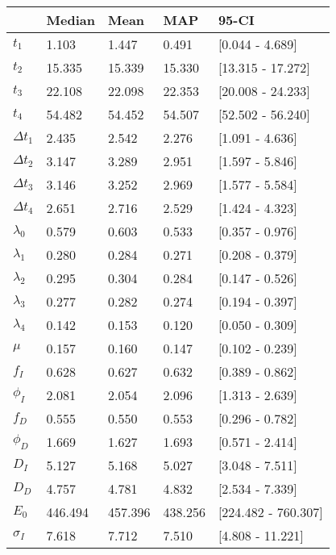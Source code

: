 \begin{tabular}{lllll}
\toprule
{} &   Median &     Mean &      MAP &                95-CI \\
\midrule
$t_1$        &    1.103 &    1.447 &    0.491 &      [0.044 - 4.689] \\
$t_2$        &   15.335 &   15.339 &   15.330 &    [13.315 - 17.272] \\
$t_3$        &   22.108 &   22.098 &   22.353 &    [20.008 - 24.233] \\
$t_4$        &   54.482 &   54.452 &   54.507 &    [52.502 - 56.240] \\
$\Delta t_1$ &    2.435 &    2.542 &    2.276 &      [1.091 - 4.636] \\
$\Delta t_2$ &    3.147 &    3.289 &    2.951 &      [1.597 - 5.846] \\
$\Delta t_3$ &    3.146 &    3.252 &    2.969 &      [1.577 - 5.584] \\
$\Delta t_4$ &    2.651 &    2.716 &    2.529 &      [1.424 - 4.323] \\
$\lambda_0$  &    0.579 &    0.603 &    0.533 &      [0.357 - 0.976] \\
$\lambda_1$  &    0.280 &    0.284 &    0.271 &      [0.208 - 0.379] \\
$\lambda_2$  &    0.295 &    0.304 &    0.284 &      [0.147 - 0.526] \\
$\lambda_3$  &    0.277 &    0.282 &    0.274 &      [0.194 - 0.397] \\
$\lambda_4$  &    0.142 &    0.153 &    0.120 &      [0.050 - 0.309] \\
$\mu$        &    0.157 &    0.160 &    0.147 &      [0.102 - 0.239] \\
$f_I$        &    0.628 &    0.627 &    0.632 &      [0.389 - 0.862] \\
$\phi_I$     &    2.081 &    2.054 &    2.096 &      [1.313 - 2.639] \\
$f_D$        &    0.555 &    0.550 &    0.553 &      [0.296 - 0.782] \\
$\phi_D$     &    1.669 &    1.627 &    1.693 &      [0.571 - 2.414] \\
$D_I$        &    5.127 &    5.168 &    5.027 &      [3.048 - 7.511] \\
$D_D$        &    4.757 &    4.781 &    4.832 &      [2.534 - 7.339] \\
$E_0$        &  446.494 &  457.396 &  438.256 &  [224.482 - 760.307] \\
$\sigma_I$   &    7.618 &    7.712 &    7.510 &     [4.808 - 11.221] \\

\end{tabular}
